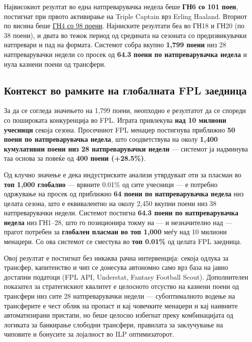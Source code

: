 Највисокиот резултат во една натпреварувачка недела беше \textbf{ГН6 со 101 поен}, постигнат при првото активирање на Triple Captain врз Erling Haaland. Вториот по висина беше \underline{ГН4 со 98 поени}. Најниските резултати беа во ГН18 и ГН20 (по 38 поени), и двата во тежок период од средината на сезоната со предизвикувачки натпревари и пад на формата. Системот собра вкупно \textbf{1{,}799 поени} низ 28 натпреварувачки недели со просек од \textbf{64.3 поени по натпреварувачка недела} и нула казнени поени од трансфери.

\subsection{Контекст во рамките на глобалната FPL заедница}

За да се согледа значењето на 1{,}799 поени, неопходно е резултатот да се спореди со пошироката конкуренција во FPL. Играта привлекува \textbf{над 10 милиони учесници} секоја сезона. Просечниот FPL менаџер постигнува приближно \textbf{50 поени по натпреварувачка недела}, што соодветствува на околу \textbf{1{,}400 кумулативни поени низ 28 натпреварувачки недели} — системот ја надминува таа основа за повеќе од \textbf{400 поени (+28.5\%)}.

Од клучно значење е дека индустриските анализи утврдуваат оти за пласман во \textbf{топ 1{,}000 глобално} — врвните 0.01\% од сите учесници — е потребно одржување на просек од приближно \textbf{64 поени по натпреварувачка недела} низ целата сезона, што е еквивалентно на околу 2{,}450 вкупни поени низ 38 натпреварувачки недели. Системот постигна \textbf{64.3 поени по натпреварувачка недела} низ ГН1--28, што го позиционира токму на — и незначително над — прагот потребен за \textbf{глобален пласман во топ 1{,}000} меѓу над 10 милиони менаџери. Со ова системот се сместува во \textbf{топ 0.01\%} од целата FPL заедница.

Овој резултат е постигнат без никаква рачна интервенција: секоја одлука за трансфер, капитенство и чип се донесува автономно само врз база на јавно достапни податоци (FPL API, Understat, Fantasy Football Scout). Дополнителен показател за стратегискиот квалитет е целосното отсуство на казнени поени од трансфери низ сите 28 натпреварувачки недели — субоптималното водење на трансферите е чест облик на пропаст и кај човечките менаџери и кај наивните автоматизирани пристапи, но беше целосно избегнат преку комбинацијата од логиката за банкирање слободни трансфери, правилата за заклучување на чиповите и бонусите за лојалност во ILP оптимизаторот.

